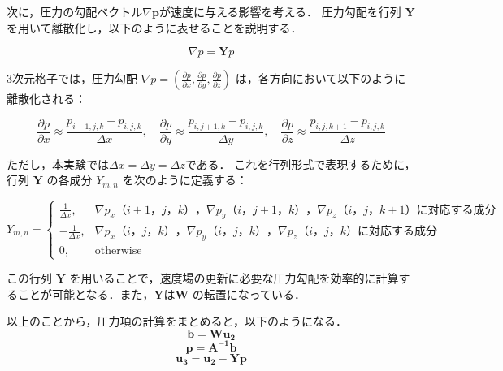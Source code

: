 \documentclass[a4j,12pt]{jreport}
\begin{document}
次に，圧力の勾配ベクトル$\nabla\bm{p}$が速度に与える影響を考える．
圧力勾配を行列 $\mathbf{Y}$ を用いて離散化し，以下のように表せることを説明する．

\begin{equation}
\nabla p = \mathbf{Y} p
\end{equation}

3次元格子では，圧力勾配 $\nabla p = (\frac{\partial p}{\partial x}, \frac{\partial p}{\partial y}, \frac{\partial p}{\partial z})$ は，各方向において以下のように離散化される：

\begin{equation}
\frac{\partial p}{\partial x} \approx \frac{p_{i+1,j,k} - p_{i,j,k}}{\Delta x}, \quad
\frac{\partial p}{\partial y} \approx \frac{p_{i,j+1,k} - p_{i,j,k}}{\Delta y}, \quad
\frac{\partial p}{\partial z} \approx \frac{p_{i,j,k+1} - p_{i,j,k}}{\Delta z}
\end{equation}

ただし，本実験では$\varDelta x = \varDelta y= \varDelta z$である．
これを行列形式で表現するために，行列 $\mathbf{Y}$ の各成分 $Y_{m,n}$ を次のように定義する：

\[
Y_{m,n} =
\begin{cases}
\frac{1}{\varDelta x}, &  \nabla p_x（i+1，j，k），\nabla p_y（i，j+1，k），\nabla p_z（i，j，k+1）に対応する成分 \\
-\frac{1}{\varDelta x}, &  \nabla p_x（i，j，k）， \nabla p_y（i，j，k）， \nabla p_z（i，j，k）に対応する成分\\
0, & \text{otherwise}
\end{cases}
\]

この行列 $\mathbf{Y}$ を用いることで，速度場の更新に必要な圧力勾配を効率的に計算することが可能となる．また，$\mathbf{Y}$は$\mathbf{W}$ の転置になっている．


以上のことから，圧力項の計算をまとめると，以下のようになる．
\[
	\bm{b} = \mathbf{W}\bm{u_2}
\]
\[
	\bm{p} = \mathbf{A^{-1}}\bm{b}
\]
\[
	\bm{u_3}  =  \bm{u_2} - \mathbf{Y}\bm{p} 
\]
\end{document}
